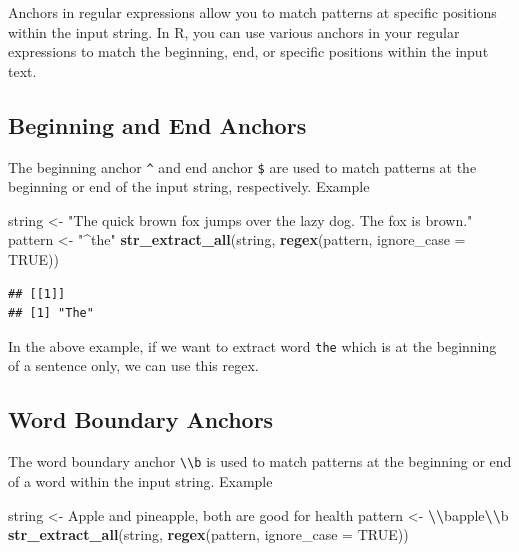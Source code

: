 \documentclass[
]{book}
\newenvironment{Shaded}{\begin{snugshade}}{\end{snugshade}}
\newcommand{\AttributeTok}[1]{\textcolor[rgb]{0.13,0.29,0.53}{#1}}
\newcommand{\ConstantTok}[1]{\textcolor[rgb]{0.56,0.35,0.01}{#1}}
\newcommand{\FunctionTok}[1]{\textcolor[rgb]{0.13,0.29,0.53}{\textbf{#1}}}
\newcommand{\NormalTok}[1]{#1}
\newcommand{\OtherTok}[1]{\textcolor[rgb]{0.56,0.35,0.01}{#1}}
\newcommand{\SpecialCharTok}[1]{\textcolor[rgb]{0.81,0.36,0.00}{\textbf{#1}}}
\newcommand{\StringTok}[1]{\textcolor[rgb]{0.31,0.60,0.02}{#1}}
\begin{document}
Anchors in regular expressions allow you to match patterns at specific positions within the input string. In R, you can use various anchors in your regular expressions to match the beginning, end, or specific positions within the input text.

\hypertarget{beginning-and-end-anchors}{%
\subsection{Beginning and End Anchors}\label{beginning-and-end-anchors}}

The beginning anchor \texttt{\^{}} and end anchor \texttt{\$} are used to match patterns at the beginning or end of the input string, respectively. Example

\begin{Shaded}
\begin{Highlighting}[]
\NormalTok{string }\OtherTok{\textless{}{-}} \StringTok{"The quick brown fox jumps over the lazy dog. The fox is brown."}
\NormalTok{pattern }\OtherTok{\textless{}{-}} \StringTok{"\^{}the"}
\FunctionTok{str\_extract\_all}\NormalTok{(string, }\FunctionTok{regex}\NormalTok{(pattern, }\AttributeTok{ignore\_case =} \ConstantTok{TRUE}\NormalTok{))}
\end{Highlighting}
\end{Shaded}

\begin{verbatim}
## [[1]]
## [1] "The"
\end{verbatim}

In the above example, if we want to extract word \texttt{the} which is at the beginning of a sentence only, we can use this regex.

\hypertarget{word-boundary-anchors}{%
\subsection{Word Boundary Anchors}\label{word-boundary-anchors}}

The word boundary anchor \texttt{\textbackslash{}\textbackslash{}b} is used to match patterns at the beginning or end of a word within the input string. Example

\begin{Shaded}
\begin{Highlighting}[]
\NormalTok{string }\OtherTok{\textless{}{-}} \StringTok{\textquotesingle{}Apple and pineapple, both are good for health\textquotesingle{}}
\NormalTok{pattern }\OtherTok{\textless{}{-}} \StringTok{\textquotesingle{}}\SpecialCharTok{\textbackslash{}\textbackslash{}}\StringTok{bapple}\SpecialCharTok{\textbackslash{}\textbackslash{}}\StringTok{b\textquotesingle{}}
\FunctionTok{str\_extract\_all}\NormalTok{(string, }\FunctionTok{regex}\NormalTok{(pattern, }\AttributeTok{ignore\_case =} \ConstantTok{TRUE}\NormalTok{))}
\end{Highlighting}
\end{Shaded}
\end{document}
